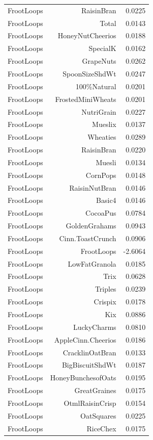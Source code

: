 \begin{longtable}{@{}lrr@{}}
FrootLoops & RaisinBran & 0.0225 \\
FrootLoops & Total & 0.0143 \\
FrootLoops & HoneyNutCheerios & 0.0188 \\
FrootLoops & SpecialK & 0.0162 \\
FrootLoops & GrapeNuts & 0.0262 \\
FrootLoops & SpoonSizeShdWt & 0.0247 \\
FrootLoops & 100\%Natural & 0.0201 \\
FrootLoops & FrostedMiniWheats & 0.0201 \\
FrootLoops & NutriGrain & 0.0227 \\
FrootLoops & Mueslix & 0.0137 \\
FrootLoops & Wheaties & 0.0289 \\
FrootLoops & RaisinBran & 0.0220 \\
FrootLoops & Muesli & 0.0134 \\
FrootLoops & CornPops & 0.0148 \\
FrootLoops & RaisinNutBran & 0.0146 \\
FrootLoops & Basic4 & 0.0146 \\
FrootLoops & CocoaPus & 0.0784 \\
FrootLoops & GoldenGrahams & 0.0943 \\
FrootLoops & Cinn.ToastCrunch & 0.0906 \\
FrootLoops & FrootLoops & -2.6064 \\
FrootLoops & LowFatGranola & 0.0185 \\
FrootLoops & Trix & 0.0628 \\
FrootLoops & Triples & 0.0239 \\
FrootLoops & Crispix & 0.0178 \\
FrootLoops & Kix & 0.0886 \\
FrootLoops & LuckyCharms & 0.0810 \\
FrootLoops & AppleCinn.Cheerios & 0.0186 \\
FrootLoops & CracklinOatBran & 0.0133 \\
FrootLoops & BigBiscuitShdWt & 0.0187 \\
FrootLoops & HoneyBunchesofOats & 0.0195 \\
FrootLoops & GreatGraines & 0.0175 \\
FrootLoops & OtmlRaisinCrisp & 0.0154 \\
FrootLoops & OatSquares & 0.0225 \\
FrootLoops & RiceChex & 0.0175 \\

\end{longtable}
